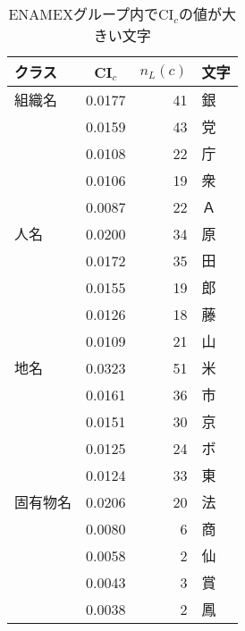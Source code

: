 \begin{table}[htbp]\small
\caption{\label{table:characters_with_CIc_enamex}ENAMEXグループ内でCI$_c$の値が大きい文字}
\begin{center}
\begin{tabular}{|l|c|r|l|} \hline
クラス   & CI$_c$ & \(n_L(c)\) & 文字 \\ \hline \hline
組織名   & 0.0177  &   41 & 銀 \\ \cline{2-4} 
         & 0.0159  &   43 & 党 \\ \cline{2-4} 
         & 0.0108  &   22 & 庁 \\ \cline{2-4} 
         & 0.0106  &   19 & 衆 \\ \cline{2-4} 
         & 0.0087  &   22 & Ａ \\ \hline \hline
人名     & 0.0200  &   34 & 原 \\ \cline{2-4} 
         & 0.0172  &   35 & 田 \\ \cline{2-4} 
         & 0.0155  &   19 & 郎 \\ \cline{2-4} 
         & 0.0126  &   18 & 藤 \\ \cline{2-4} 
         & 0.0109  &   21 & 山 \\ \hline \hline
地名     & 0.0323  &   51 & 米 \\ \cline{2-4} 
         & 0.0161  &   36 & 市 \\ \cline{2-4} 
         & 0.0151  &   30 & 京 \\ \cline{2-4} 
         & 0.0125  &   24 & ボ \\ \cline{2-4} 
         & 0.0124  &   33 & 東 \\ \hline \hline
固有物名 & 0.0206  &   20 & 法 \\ \cline{2-4} 
         & 0.0080  &    6 & 商 \\ \cline{2-4} 
         & 0.0058  &    2 & 仙 \\ \cline{2-4} 
         & 0.0043  &    3 & 賞 \\ \cline{2-4} 
         & 0.0038  &    2 & 鳳 \\ \hline
\end{tabular}
\end{center}


\end{table}
